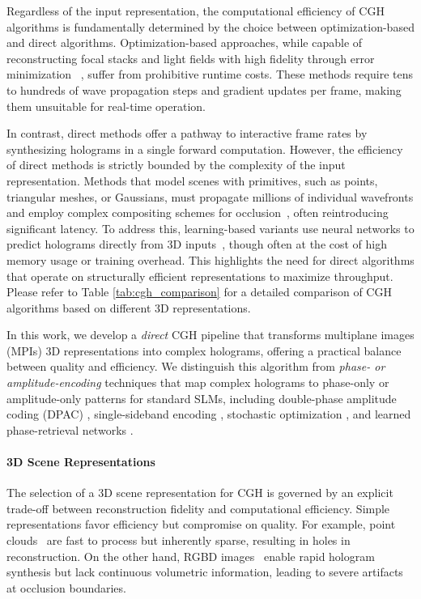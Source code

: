 Regardless of the input representation, the computational efficiency of CGH algorithms is fundamentally determined by the choice between optimization-based and direct algorithms. Optimization-based approaches, while capable of reconstructing focal stacks and light fields with high fidelity through error minimization ~\cite{chakravarthula2019wirtinger, zhang20173d, peng2020neural, fienup1980iterative, gerchberg1972practical, schiffers2023stochastic}, suffer from prohibitive runtime costs. These methods require tens to hundreds of wave propagation steps and gradient updates per frame, making them unsuitable for real-time operation.

In contrast, direct methods offer a pathway to interactive frame rates by synthesizing holograms in a single forward computation. However, the efficiency of direct methods is strictly bounded by the complexity of the input representation. Methods that model scenes with primitives, such as points, triangular meshes, or Gaussians, must propagate millions of individual wavefronts and employ complex compositing schemes for occlusion~\cite{matsushima2014silhouette, choi2025gaussian, chao2025rpws}, often reintroducing significant latency. To address this, learning-based variants use neural networks to predict holograms directly from 3D inputs~\cite{shi2021towards, yang2022diffraction}, though often at the cost of high memory usage or training overhead. This highlights the need for direct algorithms that operate on structurally efficient representations to maximize throughput. Please refer to Table \ref{tab:cgh_comparison} for a detailed comparison of CGH algorithms based on different 3D representations.

In this work, we develop a \textit{direct} CGH pipeline that transforms multiplane images (MPIs) 3D representations into complex holograms, offering a practical balance between quality and efficiency. We distinguish this algorithm from \textit{phase- or amplitude-encoding} techniques that map complex holograms to phase-only or amplitude-only patterns for standard SLMs, including double-phase amplitude coding (DPAC) \cite{dpac}, single-sideband encoding \cite{sideband}, stochastic optimization \cite{peng2020neural}, and learned phase-retrieval networks \cite{shi2021towards}.



\paragraph{\bf{3D Scene Representations}} The selection of a 3D scene representation for CGH is governed by an explicit trade-off between reconstruction fidelity and computational efficiency. Simple representations favor efficiency but compromise on quality. For example, point clouds~\cite{maimone2017holographic} are fast to process but inherently sparse, resulting in holes in reconstruction. On the other hand, RGBD images~\cite{choi2021neural, peng2020neural} enable rapid hologram synthesis but lack continuous volumetric information, leading to severe artifacts at occlusion boundaries.


